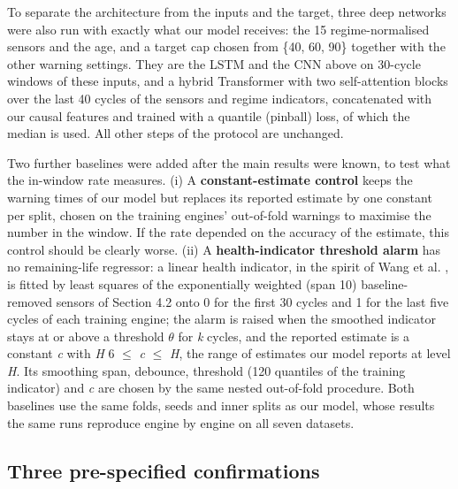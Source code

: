 \documentclass[a4paper,fleqn,doubleblind]{cas-dc}
\begin{document}
To separate the architecture from the inputs and the target, three deep networks were also run with exactly what our model receives: the 15 regime-normalised sensors and the age, and a target cap chosen from \{40, 60, 90\} together with the other warning settings. They are the LSTM and the CNN above on 30-cycle windows of these inputs, and a hybrid Transformer with two self-attention blocks over the last 40 cycles of the sensors and regime indicators, concatenated with our causal features and trained with a quantile (pinball) loss, of which the median is used. All other steps of the protocol are unchanged.

Two further baselines were added after the main results were known, to test what the in-window rate measures. (i) A \textbf{constant-estimate control} keeps the warning times of our model but replaces its reported estimate by one constant per split, chosen on the training engines' out-of-fold warnings to maximise the number in the window. If the rate depended on the accuracy of the estimate, this control should be clearly worse. (ii) A \textbf{health-indicator threshold alarm} has no remaining-life regressor: a linear health indicator, in the spirit of Wang et al. \cite{wang2008}, is fitted by least squares of the exponentially weighted (span 10) baseline-removed sensors of Section 4.2 onto 0 for the first 30 cycles and 1 for the last five cycles of each training engine; the alarm is raised when the smoothed indicator stays at or above a threshold $\theta$ for \textit{k} cycles, and the reported estimate is a constant \textit{c} with \textit{H} \textminus{} 6 $\le$ \textit{c} $\le$ \textit{H}, the range of estimates our model reports at level \textit{H}. Its smoothing span, debounce, threshold (120 quantiles of the training indicator) and \textit{c} are chosen by the same nested out-of-fold procedure. Both baselines use the same folds, seeds and inner splits as our model, whose results the same runs reproduce engine by engine on all seven datasets.

\subsection{Three pre-specified confirmations}
\end{document}
